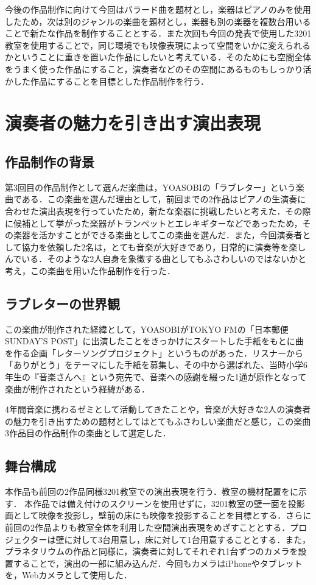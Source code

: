 今後の作品制作に向けて今回はバラード曲を題材とし，楽器はピアノのみを使用したため，次は別のジャンルの楽曲を題材とし，楽器も別の楽器を複数台用いることで新たな作品を制作することとする．また次回も今回の発表で使用した3201教室を使用することで，同じ環境でも映像表現によって空間をいかに変えられるかということに重きを置いた作品にしたいと考えている．そのためにも空間全体をうまく使った作品にすること，演奏者などのその空間にあるものもしっかり活かした作品にすることを目標とした作品制作を行う．


\section{演奏者の魅力を引き出す演出表現}
\subsection{作品制作の背景}
第3回目の作品制作として選んだ楽曲は，YOASOBIの「ラブレター」\cite{loveletter}という楽曲である．この楽曲を選んだ理由として，前回までの2作品はピアノの生演奏に合わせた演出表現を行っていたため，新たな楽器に挑戦したいと考えた．その際に候補として挙がった楽器がトランペットとエレキギターなどであったため，その楽器を活かすことができる楽曲としてこの楽曲を選んだ．また，今回演奏者として協力を依頼した2名は，とても音楽が大好きであり，日常的に演奏等を楽しんでいる．そのような2人自身を象徴する曲としてもふさわしいのではないかと考え，この楽曲を用いた作品制作を行った．

\subsection{ラブレターの世界観}
この楽曲が制作された経緯として，YOASOBIがTOKYO FMの「日本郵便 SUNDAY’S POST」に出演したことをきっかけにスタートした手紙をもとに曲を作る企画「レターソングプロジェクト」\cite{lettersong}というものがあった．リスナーから「ありがとう」をテーマにした手紙を募集し、その中から選ばれた、当時小学6年生の『音楽さんへ』という宛先で、音楽への感謝を綴った1通が原作となって楽曲が制作されたという経緯がある．

4年間音楽に携わるゼミとして活動してきたことや，音楽が大好きな2人の演奏者の魅力を引き出すための題材としてはとてもふさわしい楽曲だと感じ，この楽曲3作品目の作品制作の楽曲として選定した．

\subsection{舞台構成}
本作品も前回の2作品同様3201教室での演出表現を行う．教室の機材配置をに示す．
本作品では備え付けのスクリーンを使用せずに，3201教室の壁一面を投影面として映像を投影し，壁前の床にも映像を投影することを目標とする．さらに前回の2作品よりも教室全体を利用した空間演出表現をめざすこととする．プロジェクターは壁に対して3台用意し，床に対して1台用意することとする．また，プラネタリウムの作品と同様に，演奏者に対してそれぞれ1台ずつのカメラを設置することで，演出の一部に組み込んだ．今回もカメラはiPhoneやタブレットを，Webカメラとして使用した．


